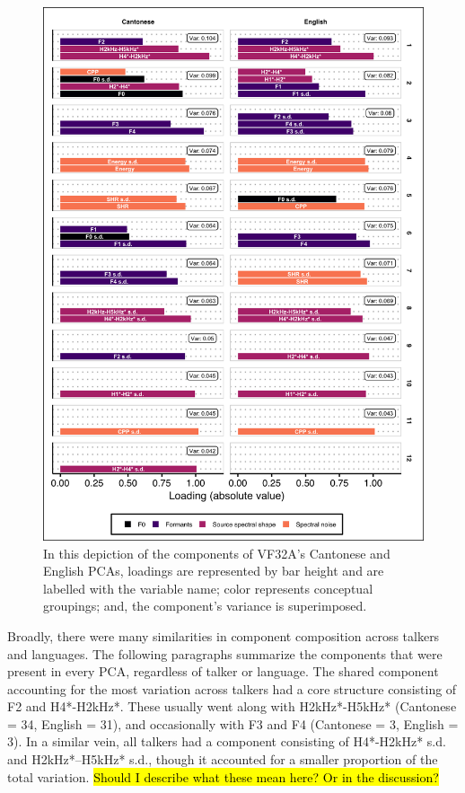 \begin{figure}[htbp]
\begin{center}
\includegraphics[width=0.8\linewidth]{figures/ch3_pca_vf32a_vert5in.png} 
\caption{In this depiction of the components of VF32A's Cantonese and English PCAs, loadings are represented by bar height and are labelled with the variable name; color represents conceptual groupings; and, the component's variance is superimposed.}
\label{ch3:fig:VF32A}
\end{center}
\end{figure}

Broadly, there were many similarities in component composition across talkers and languages. The following paragraphs summarize the components that were present in every PCA, regardless of talker or language. The shared component accounting for the most variation across talkers had a core structure consisting of F2 and H4*-H2kHz*. These usually went along with H2kHz*-H5kHz* (Cantonese = 34, English = 31), and occasionally with F3 and F4 (Cantonese = 3, English = 3). In a similar vein, all talkers had a component consisting of H4*-H2kHz* s.d. and H2kHz*--H5kHz* s.d., though it accounted for a smaller proportion of the total variation. \hl{Should I describe what these mean here? Or in the discussion?}

